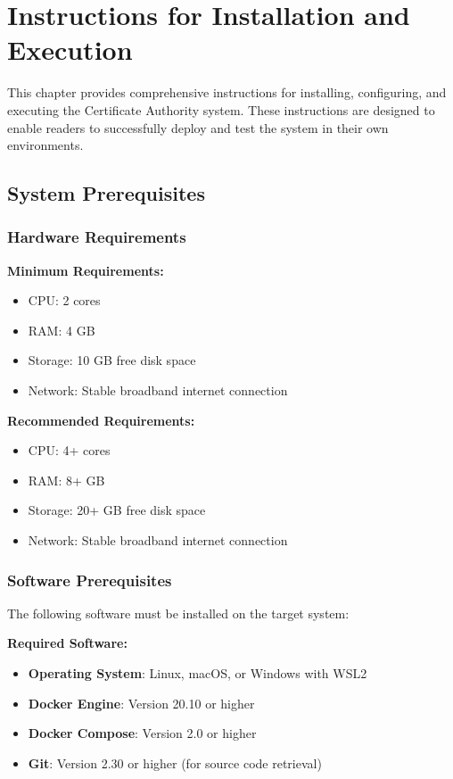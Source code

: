 \chapter{Instructions for Installation and Execution}

This chapter provides comprehensive instructions for installing, configuring, and executing the Certificate Authority system. These instructions are designed to enable readers to successfully deploy and test the system in their own environments.

\section{System Prerequisites}

\subsection{Hardware Requirements}

\textbf{Minimum Requirements:}
\begin{itemize}
    \item CPU: 2 cores
    \item RAM: 4 GB
    \item Storage: 10 GB free disk space
    \item Network: Stable broadband internet connection 
\end{itemize}

\textbf{Recommended Requirements:}
\begin{itemize}
    \item CPU: 4+ cores
    \item RAM: 8+ GB
    \item Storage: 20+ GB free disk space
    \item Network: Stable broadband internet connection
\end{itemize}

\subsection{Software Prerequisites}

The following software must be installed on the target system:

\textbf{Required Software:}
\begin{itemize}
    \item \textbf{Operating System}: Linux, macOS, or Windows with WSL2
    \item \textbf{Docker Engine}: Version 20.10 or higher
    \item \textbf{Docker Compose}: Version 2.0 or higher
    \item \textbf{Git}: Version 2.30 or higher (for source code retrieval)
\end{itemize}

